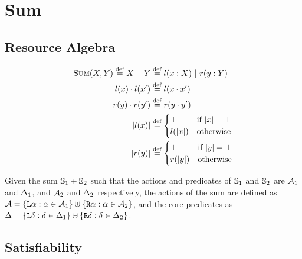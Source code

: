 \section{Sum} \label{rules:sum}

\subsection{Resource Algebra}

\begin{align*}
	\textsc{Sum}(X, Y) \stackrel{\textnormal{def}}= X+Y &\stackrel{\textnormal{def}}= l(x: X) ~|~ r(y: Y)\\
	l(x)\cdot l(x') &\stackrel{\textnormal{def}}= l(x\cdot x')\\
	r(y)\cdot r(y')&\stackrel{\textnormal{def}}= r(y\cdot y')\\
	|l(x)|&\stackrel{\textnormal{def}}= \begin{cases}
 		\bot &\text{if}~ |x|=\bot\\
 		l(|x|) &\text{otherwise}
	 \end{cases}\\
	 |r(y)|&\stackrel{\textnormal{def}}= \begin{cases}
 		\bot &\text{if}~ |y|=\bot\\
 		r(|y|) &\text{otherwise}
	 \end{cases}
\end{align*}

Given the sum $\mathbb S_1 + \mathbb S_2$ such that the actions and predicates of $\mathbb S_1$ and $\mathbb S_2$ are ${\cal{A}}_1$ and $\Delta_1$, and ${\cal{A}}_2$ and $\Delta_2$ respectively, the actions of the sum are defined as ${{\cal{A}} = \{\texttt{L}\alpha : \alpha \in {\ensuremath{\cal{A}}}_1 \} \uplus \{\texttt{R}\alpha : \alpha \in {\ensuremath{\cal{A}}}_2 \}}$, and the core predicates as ${\Delta = \{\texttt{L}\delta : \delta \in \Delta_1 \} \uplus \{\texttt{R}\delta : \delta \in \Delta_2 \}}$.

\subsection{Satisfiability}


